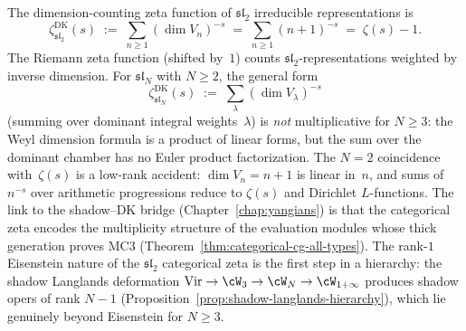 \begin{remark}
\label{rem:categorical-zeta-riemann}
The dimension-counting zeta function of $\mathfrak{sl}_2$
irreducible representations is
\begin{equation}\label{eq:categorical-zeta-sl2}
 \zeta^{\mathrm{DK}}_{\mathfrak{sl}_2}(s)
 \;:=\;
 \sum_{n \ge 1} (\dim V_n)^{-s}
 \;=\;
 \sum_{n \ge 1} (n+1)^{-s}
 \;=\;
 \zeta(s) - 1.
\end{equation}
The Riemann zeta function (shifted by~$1$) counts
$\mathfrak{sl}_2$-representations weighted by inverse
dimension. For $\mathfrak{sl}_N$ with $N \ge 2$, the
general form
\begin{equation}\label{eq:categorical-zeta-slN}
 \zeta^{\mathrm{DK}}_{\mathfrak{sl}_N}(s)
 \;:=\;
 \sum_{\lambda} (\dim V_\lambda)^{-s}
\end{equation}
(summing over dominant integral weights~$\lambda$) is
\emph{not} multiplicative for $N \ge 3$: the Weyl
dimension formula is a product of linear forms, but
the sum over the dominant chamber has no Euler product
factorization. The $N = 2$ coincidence with~$\zeta(s)$
is a low-rank accident: $\dim V_n = n + 1$ is linear
in~$n$, and sums of $n^{-s}$ over arithmetic
progressions reduce to $\zeta(s)$ and Dirichlet
$L$-functions. The link to the shadow--DK bridge
(Chapter~\ref{chap:yangians}) is that the categorical
zeta encodes the multiplicity structure of the evaluation
modules whose thick generation proves MC3
(Theorem~\ref{thm:categorical-cg-all-types}).
The rank-$1$ Eisenstein nature of the $\mathfrak{sl}_2$
categorical zeta is the first step in a hierarchy: the
shadow Langlands deformation
$\mathrm{Vir} \to \cW_3 \to \cW_N \to \cW_{1+\infty}$
produces shadow opers of rank $N{-}1$
(Proposition~\ref{prop:shadow-langlands-hierarchy}),
which lie genuinely beyond Eisenstein for $N \ge 3$.
\end{remark}

